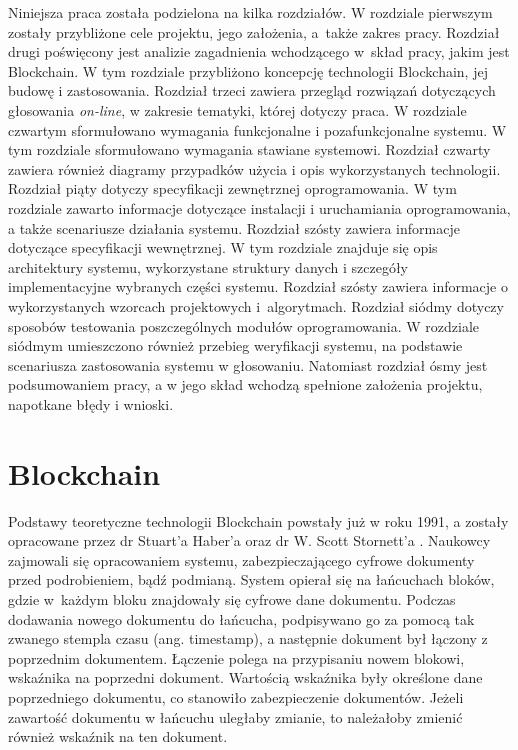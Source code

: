 \documentclass[a4paper,12pt]{book}
\begin{document}
Niniejsza praca została podzielona na kilka rozdziałów. W rozdziale pierwszym zostały przybliżone cele projektu, jego założenia, a~także zakres pracy. Rozdział drugi poświęcony jest analizie zagadnienia wchodzącego w~skład pracy, jakim jest Blockchain. W tym rozdziale przybliżono koncepcję technologii Blockchain, jej budowę i zastosowania. Rozdział trzeci zawiera przegląd rozwiązań dotyczących głosowania \textit{on-line}, w zakresie tematyki, której dotyczy praca. W rozdziale czwartym sformułowano wymagania funkcjonalne i pozafunkcjonalne systemu. W tym rozdziale sformułowano wymagania stawiane systemowi. Rozdział czwarty zawiera również diagramy przypadków użycia i opis wykorzystanych technologii. Rozdział piąty dotyczy specyfikacji zewnętrznej oprogramowania. W tym rozdziale zawarto informacje dotyczące instalacji i uruchamiania oprogramowania, a także scenariusze działania systemu. Rozdział szósty zawiera informacje dotyczące specyfikacji wewnętrznej. W tym rozdziale znajduje się opis architektury systemu, wykorzystane struktury danych i szczegóły implementacyjne wybranych części systemu. Rozdział szósty zawiera informacje o wykorzystanych wzorcach projektowych i~algorytmach. Rozdział siódmy dotyczy sposobów testowania poszczególnych modułów oprogramowania. W rozdziale siódmym umieszczono również przebieg weryfikacji systemu, na podstawie scenariusza zastosowania systemu w głosowaniu. Natomiast rozdział ósmy jest podsumowaniem pracy, a w jego skład wchodzą spełnione założenia projektu, napotkane błędy i wnioski.

\chapter{Blockchain}
Podstawy teoretyczne technologii Blockchain powstały już w roku 1991, a zostały opracowane przez dr Stuart'a Haber'a oraz dr W. Scott Stornett'a \cite{bchistory}. Naukowcy zajmowali się opracowaniem systemu, zabezpieczającego cyfrowe dokumenty przed podrobieniem, bądź podmianą. System opierał się na łańcuchach bloków, gdzie w~każdym bloku znajdowały się cyfrowe dane dokumentu. Podczas dodawania nowego dokumentu do łańcucha, podpisywano go za pomocą tak zwanego stempla czasu (ang. timestamp), a następnie dokument był łączony z poprzednim dokumentem. Łączenie polega na przypisaniu nowem blokowi, wskaźnika na poprzedni dokument. Wartością wskaźnika były określone dane poprzedniego dokumentu, co stanowiło zabezpieczenie dokumentów. Jeżeli zawartość dokumentu w łańcuchu uległaby zmianie, to należałoby zmienić również wskaźnik na ten dokument\cite{pa}.
\end{document}
